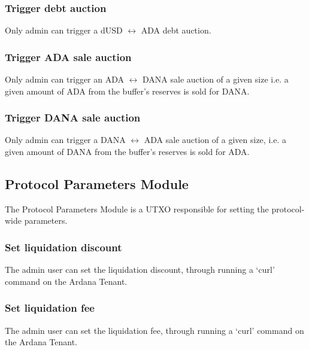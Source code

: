 \documentclass{article} %
\begin{document}
\subsubsection{Trigger debt auction}

Only admin can trigger a dUSD $\leftrightarrow$ ADA debt auction.

%

\subsubsection{Trigger ADA sale auction}

Only admin can trigger an ADA $\leftrightarrow$ DANA sale auction of a given size
i.e. a given amount of ADA from the buffer's reserves is sold for DANA.

\subsubsection{Trigger DANA sale auction}

Only admin can trigger a DANA $\leftrightarrow$ ADA sale auction of a given size,
i.e. a given amount of DANA from the buffer's reserves is sold for ADA.

\subsection{Protocol Parameters Module}

The Protocol Parameters Module is a UTXO responsible for setting the protocol-wide parameters.

\subsubsection{Set liquidation discount}

The admin user can set the liquidation discount, through running a `curl'
command on the Ardana Tenant.

\subsubsection{Set liquidation fee}

The admin user can set the liquidation fee, through running a `curl' command on
the Ardana Tenant.
\end{document}
